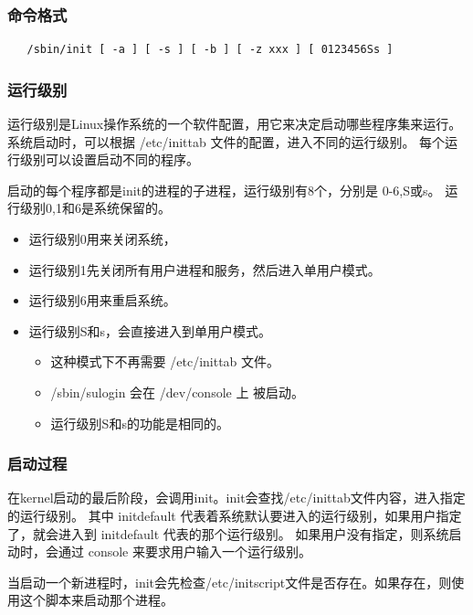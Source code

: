 \subsubsection{命令格式}

{\begin{shaded}\begin{verbatim}
   /sbin/init [ -a ] [ -s ] [ -b ] [ -z xxx ] [ 0123456Ss ]
\end{verbatim}\end{shaded}}
\subsubsection{运行级别}

运行级别是Linux操作系统的一个软件配置，用它来决定启动哪些程序集来运行。
系统启动时，可以根据 /etc/inittab 文件的配置，进入不同的运行级别。
每个运行级别可以设置启动不同的程序。

启动的每个程序都是init的进程的子进程，运行级别有8个，分别是 0-6,S或s。
运行级别0,1和6是系统保留的。

\begin{itemize}
\item
  运行级别0用来关闭系统，
\item
  运行级别1先关闭所有用户进程和服务，然后进入单用户模式。
\item
  运行级别6用来重启系统。
\item
  运行级别S和s，会直接进入到单用户模式。
  \begin{itemize}
  \item
    这种模式下不再需要 /etc/inittab 文件。
  \item
    /sbin/sulogin 会在 /dev/console 上 被启动。
  \item
    运行级别S和s的功能是相同的。
  \end{itemize}
\end{itemize}
\subsubsection{启动过程}

在kernel启动的最后阶段，会调用init。init会查找/etc/inittab文件内容，进入指定的运行级别。
其中 initdefault
代表着系统默认要进入的运行级别，如果用户指定了，就会进入到 initdefault
代表的那个运行级别。 如果用户没有指定，则系统启动时，会通过 console
来要求用户输入一个运行级别。

当启动一个新进程时，init会先检查/etc/initscript文件是否存在。如果存在，则使用这个脚本来启动那个进程。

